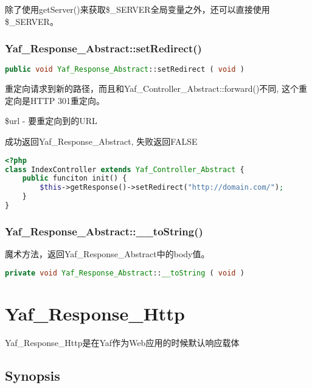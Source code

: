 除了使用getServer()来获取\$\_SERVER全局变量之外，还可以直接使用\$\_SERVER。


\subsection{Yaf\_Response\_Abstract::setRedirect()}


\begin{lstlisting}[language=PHP]
public void Yaf_Response_Abstract::setRedirect ( void )
\end{lstlisting}

重定向请求到新的路径，而且和Yaf\_Controller\_Abstract::forward()不同, 这个重定向是HTTP 301重定向。


\begin{compactitem}
\item \$url - 要重定向到的URL
\end{compactitem}

成功返回Yaf\_Response\_Abstract, 失败返回FALSE

\begin{lstlisting}[language=PHP]
<?php
class IndexController extends Yaf_Controller_Abstract {
    public funciton init() {
        $this->getResponse()->setRedirect("http://domain.com/");
    }
}
\end{lstlisting}


\subsection{Yaf\_Response\_Abstract::\_\_toString()}

魔术方法，返回Yaf\_Response\_Abstract中的body值。

\begin{lstlisting}[language=PHP]
private void Yaf_Response_Abstract::__toString ( void )
\end{lstlisting}


\chapter{Yaf\_Response\_Http}

Yaf\_Response\_Http是在Yaf作为Web应用的时候默认响应载体

\section{Synopsis}


